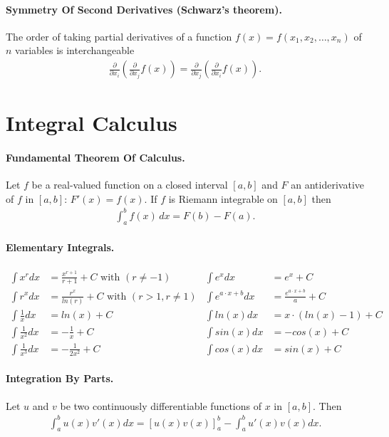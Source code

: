 \documentclass{article}
\begin{document}
\paragraph{Symmetry Of Second Derivatives (Schwarz's theorem).} The order of taking partial derivatives of a function $f(x) = f(x_1, x_2, \dots , x_n)$ of $n$ variables is interchangeable
\begin{gather*}
    \frac{\partial}{\partial x_i} \left( \frac{\partial}{\partial x_j} f(x) \right) = \frac{\partial}{\partial x_j} \left( \frac{\partial}{\partial x_i} f(x) \right).
\end{gather*}




\section{Integral Calculus} \label{integralCalculus}

\paragraph{Fundamental Theorem Of Calculus.} 
Let  $f$ be a real-valued function on a closed interval $[a,b]$ and $F$ an antiderivative of $f$ in $[a,b]$: $F'(x)=f(x)$. If $f$ is Riemann integrable on $[a,b]$ then
\begin{gather*}
    \int _{a}^{b}f(x)\,dx=F(b)-F(a).
\end{gather*}

\paragraph{Elementary Integrals.}
\begin{align*}
    \int x^r dx &= \frac{x^{r + 1}}{r+1} + C \text{ with } (r \neq -1) 
    &\int e^x dx &= e^x + C \\
    \int r^x dx &= \frac{r^{x}}{ln(r)} + C \text{ with } (r > 1, r \neq 1) 
    &\int e^{a \cdot x + b} dx &= \frac{e^{a \cdot x + b}}{a} + C \\
    \int \frac{1}{x} dx &= ln(x) + C 
    &\int ln(x) dx &= x \cdot (ln(x) - 1) + C \\
    \int \frac{1}{x^2} dx &= - \frac{1}{x} + C 
    &\int sin(x) dx &= - cos(x) + C \\
    \int \frac{1}{x^3} dx &= - \frac{1}{2x^2} + C
    &\int cos(x) dx &= sin(x) + C
\end{align*}

\paragraph{Integration By Parts.} Let $u$ and $v$ be two continuously differentiable functions of $x$ in $[a,b]$. Then
\begin{gather*}
   \int_{a}^{b} u(x)v'(x) dx = \left[ u(x)v(x) \right]_a^b - \int_{a}^{b} u'(x)v(x) dx.
\end{gather*}
\end{document}
